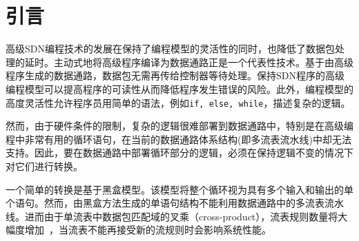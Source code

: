 \documentclass{ctexart}
\newcommand{\codeword}[1]{\texttt{\small{#1}}}
\begin{document}
 
%
%




\section{引言} 
\label{sec:intro}

高级SDN编程技术的发展在保持了编程模型的灵活性的同时，也降低了数据包处理的延时。主动式地将高级程序编译为数据通路正是一个代表性技术。基于由高级程序生成的数据通路，数据包无需再传给控制器等待处理。保持SDN程序的高级编程模型可以提高程序的可读性从而降低程序发生错误的风险。此外，编程模型的高度灵活性允许程序员用简单的语法，例如\codeword{if, else, while}，描述复杂的逻辑。

然而，由于硬件条件的限制，复杂的逻辑很难部署到数据通路中，特别是在高级编程中非常有用的循环语句，在当前的数据通路体系结构(即多流表流水线)中却无法支持。因此，要在数据通路中部署循环部分的逻辑，必须在保持逻辑不变的情况下对它们进行转换。

一个简单的转换是基于黑盒模型。该模型将整个循环视为具有多个输入和输出的单个语句。然而，由黑盒方法生成的单语句结构不能利用数据通路中的多流表流水线。进而由于单流表中数据包匹配域的叉乘（cross-product），流表规则数量将大幅度增加~\cite{openflow1-3-1}，当流表不能再接受新的流规则时会影响系统性能。
\end{document}

